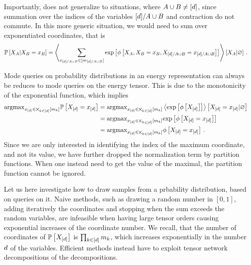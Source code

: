 Importantly,  does not generalize to situations, where $A\cup B\neq[d]$, since summation over the indices of the variables $[d]/A\cup B$ and contraction do not commute.
In this more generic situation, we would need to sum over exponentiated coordinates, that is
\begin{align*}
    \mathbb{P}\left[X_{A}|X_{B}=x_{B}\right]
    = \left\langle 
        \sum_{x_{[d]/A\cup B}\in[m_{[d]/A\cup B}]}
        \mathrm{exp}\left[\phi\left[X_{A},X_{B}=x_{B},X_{[d]/A\cup B}=x_{[d]/A\cup B}\right]\right]
    \right\rangle \left[ X_{A} | \varnothing \right] \, .
\end{align*}


Mode queries on probability distributions in an energy representation can always be reduces to mode queries on the energy tensor.
This is due to the monotonicity of the exponential function, which implies
\begin{align*}
    \mathrm{argmax}_{x_{[d]}\in\bigtimes_{k\in[d]}[m_{k}]} \mathbb{P}\left[X_{[d]}=x_{[d]}\right]
    &=\mathrm{argmax}_{x_{[d]}\in\bigtimes_{k\in[d]}[m_{k}]} \left\langle \mathrm{exp}\left[\phi\left[X_{[d]}\right]\right]\right\rangle \left[ X_{[d]}=x_{[d]} | \varnothing \right] \\
    &=\mathrm{argmax}_{x_{[d]}\in\bigtimes_{k\in[d]}[m_{k}]} \mathrm{exp}\left[\phi\left[X_{[d]}=x_{[d]}\right]\right] \\
    &=\mathrm{argmax}_{x_{[d]}\in\bigtimes_{k\in[d]}[m_{k}]} \phi\left[X_{[d]}=x_{[d]}\right] \, .
\end{align*}
Since we are only interested in identifying the index of the maximum coordinate, and not its value, we have further dropped the normalization term by partition functions.
When one instead need to get the value of the maximal, the partition function cannot be ignored.


Let us here investigate how to draw samples from a prbability distribution, based on queries on it.
Naive methods, such as drawing a random number in $[0,1]$, adding iteratively the coordinates and stopping when the sum exceeds the random variables, are infeasible when having large tensor orders causing exponential increases of the coordinate number.
We recall, that the number of coordinates of $\mathbb{P}\left[X_{[d]}\right]$ is $\prod_{k\in[d]}m_{k}$, which increases exponentially in the number $d$ of the variables.
Efficient methods instead have to exploit tensor network decompositions of the decompositions.

